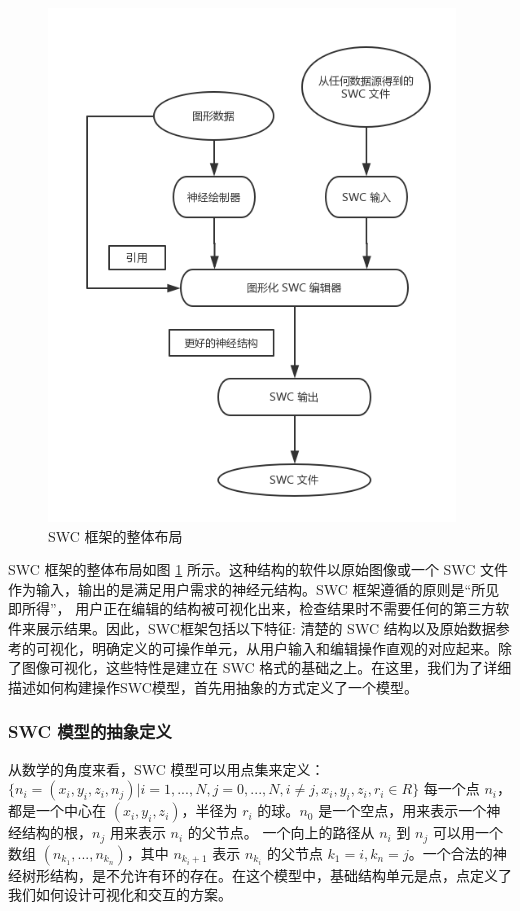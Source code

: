 {\begin{figure}
\centering
\includegraphics[width=108mm]{images/t1}
\caption{SWC 框架的整体布局}
\label{fan1}
\end{figure}

SWC 框架的整体布局如图 \ref{fan1} 所示。这种结构的软件以原始图像或一个 SWC 文件作为输入，输出的是满足用户需求的神经元结构。SWC 框架遵循的原则是“所见即所得”， 用户正在编辑的结构被可视化出来，检查结果时不需要任何的第三方软件来展示结果。因此，SWC框架包括以下特征: 清楚的 SWC 结构以及原始数据参考的可视化，明确定义的可操作单元，从用户输入和编辑操作直观的对应起来。除了图像可视化，这些特性是建立在 SWC 格式的基础之上。在这里，我们为了详细描述如何构建操作SWC模型，首先用抽象的方式定义了一个模型。

\subsubsection{SWC 模型的抽象定义}

从数学的角度来看，SWC 模型可以用点集来定义：$\{ n_i = (x_i, y_i, z_i, n_j) | i = 1,..., N, j = 0,..., N, i \neq j, x_i, y_i, z_i, r_i \in R \}$ 每一个点 $n_i$， 都是一个中心在 $(x_i, y_i, z_i)$，半径为 $r_i$ 的球。$n_0$ 是一个空点，用来表示一个神经结构的根，$n_j$ 用来表示 $n_i$ 的父节点。 一个向上的路径从 $n_i$ 到 $n_j$ 可以用一个数组 $(n_{k_1},...,n_{k_n})$，其中 $n_{k_i+1}$ 表示 $n_{k_i}$ 的父节点 $k_1 = i, k_n = j$。一个合法的神经树形结构，是不允许有环的存在。在这个模型中，基础结构单元是点，点定义了我们如何设计可视化和交互的方案。

}
